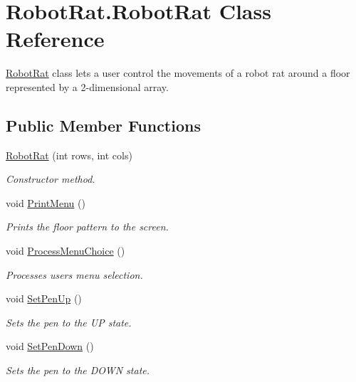 \hypertarget{class_robot_rat_1_1_robot_rat}{}\section{Robot\+Rat.\+Robot\+Rat Class Reference}
\label{class_robot_rat_1_1_robot_rat}


\hyperlink{class_robot_rat_1_1_robot_rat}{Robot\+Rat} class lets a user control the movements of a robot rat around a floor represented by a 2-\/dimensional array.  


\subsection*{Public Member Functions}
\begin{DoxyCompactItemize}
\item 
\hyperlink{class_robot_rat_1_1_robot_rat_a8b4d65268fabd396c4219ca433ab81ea}{Robot\+Rat} (int rows, int cols)
\begin{DoxyCompactList}\small\item\em Constructor method. \end{DoxyCompactList}\item 
void \hyperlink{class_robot_rat_1_1_robot_rat_af9553868271779ff859b038a735d5736}{Print\+Menu} ()
\begin{DoxyCompactList}\small\item\em Prints the floor pattern to the screen. \end{DoxyCompactList}\item 
void \hyperlink{class_robot_rat_1_1_robot_rat_ab481ea2a81b9ec687a98ec34ccf78b55}{Process\+Menu\+Choice} ()
\begin{DoxyCompactList}\small\item\em Processes user\textquotesingle{}s menu selection. \end{DoxyCompactList}\item 
void \hyperlink{class_robot_rat_1_1_robot_rat_a4549f931edb43018210a08c95ba9a996}{Set\+Pen\+Up} ()
\begin{DoxyCompactList}\small\item\em Sets the pen to the UP state. \end{DoxyCompactList}\item 
void \hyperlink{class_robot_rat_1_1_robot_rat_a36ca12096468ac6d56caf2eef6d2fbdc}{Set\+Pen\+Down} ()
\begin{DoxyCompactList}\small\item\em Sets the pen to the D\+O\+WN state. \end{DoxyCompactList}\item 

\end{DoxyCompactItemize}
